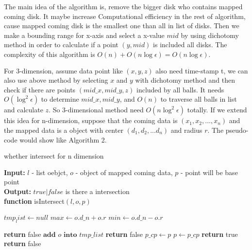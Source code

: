 \documentclass[10pt, conference, compsocconf]{IEEEtran}
\begin{document}
The main idea of the algorithm is, remove the bigger disk who contains mapped coming disk. It maybe increase Computational efficiency in the rest of algorithm, cause mapped coming disk is the smallest one than all in list of disks. Then we make a bounding range for x-axis and select a x-value $mid$ by using dichotomy method in order to calculate if a point $(y, mid)$ is included all disks. The complexity of this algorithm is $O(n)+O(n\log\epsilon) = O(n\log\epsilon)$.

For 3-dimension, assume data point like $(x, y, z)$ also need time-stamp t, we can also use above method by selecting $x$ and $y$ with dichotomy method and then check if there are points $(mid\_x, mid\_y, z)$ included by all balls. It needs $O(\log^2\epsilon)$ to determine $mid\_x, mid\_y$, and $O(n)$ to traverse all balls in list and calculate $z$. So 3-dimensional method need $O(n \log^2\epsilon)$ totally. If we extend this idea for n-dimension, suppose that the coming data is $(x_1,x_2,...,x_n)$ and the mapped data is a object with center $(d_1,d_2,...d_n)$ and radius $r$. The pseudo-code would show like Algorithm 2.

\begin{algorithm}
    \caption{whether intersect  for n dimension}
    \begin{flushleft}
        \textbf{Input:} $l$ - list oebjct, $o$ - object of mapped coming data, $p$ - point will be base point\\
        \textbf{Output:} $true|false$  is there a intersection\\
        \textbf{function} isIntersect$(l, o, p)$
    \end{flushleft}
    \begin{algorithmic}[1]
        \STATE $tmp_list \gets null$
        \STATE $max \gets o.d\_n+o.r$
        \STATE $min \gets o.d\_n-o.r$
        
                \STATE \textbf{return} false
            \ENDIF
        \ENDFOR
        \STATE $\textbf{add } o \textbf{ into } tmp\_list$
            \STATE \textbf{return} false
        \ENDIF
        $p\_cp \gets p$
            \STATE $p \gets p\_cp$
            \STATE \textbf{return} true
        \ELSE
            \STATE \textbf{return} false
        \ENDIF
    \end{algorithmic}
\end{algorithm}
\end{document}
